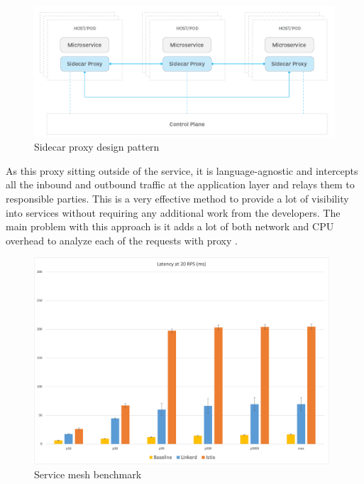 \begin{figure}[H]
    \includegraphics[width=16cm]{assets/literature-review/sidecar-proxy.png}
    \caption{Sidecar proxy design pattern \citep{Whatissi48:online}}
    \label{fig:sidecar-proxy}
\end{figure}

As this proxy sitting outside of the service, it is language-agnostic and intercepts all the inbound and outbound traffic at the application layer and relays them to responsible parties. This is a very effective method to provide a lot of visibility into services without requiring any additional work from the developers. The main problem with this approach is it adds a lot of both network and CPU overhead to analyze each of the requests with proxy \citep{Benchmar93:online}.

\begin{figure}[H]
    \includegraphics[width=11cm]{assets/literature-review/linkerd-benchmark.png}
    \caption{Service mesh benchmark \citep{Benchmar93:online}}
    \label{fig:linkerd-benchmark}
\end{figure}


